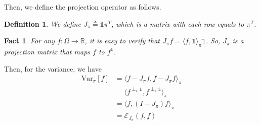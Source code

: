 \documentclass{article}
\newtheorem{define}{Definition}
\newtheorem{fact}{Fact}
\def\<{\langle}
\def\>{\rangle}
\def\Var{\mathrm{Var}}
\begin{document}
Then, we define the projection operator as follows.
\begin{define}
  We define $J_\pi \triangleq \mathbb{1}\pi^T$, which is a matrix with each row equals to $\pi^T$.
\end{define}
\begin{fact}
  For any $f: \Omega \to \mathbb{R}$, it is easy to verify that $J_\pi f = \<f, \mathbb{1}\>_\pi\mathbb{1}$.
  So, $J_\pi$ is a projection matrix that maps $f$ to $f^{\mathbb{1}}$.
\end{fact}
Then, for the variance, we have
\begin{align*}
  \Var_\pi[f]
  &= \<f - J_\pi f, f - J_\pi f\>_\pi \\
  &= \<f^{\perp_\pi \mathbb{1}}, f^{\perp_\pi \mathbb{1}}\>_\pi \\
  &= \<f, (I - J_\pi) f\>_\pi \\
  &= \mathcal{E}_{J_\pi}(f, f)
\end{align*}
\end{document}
